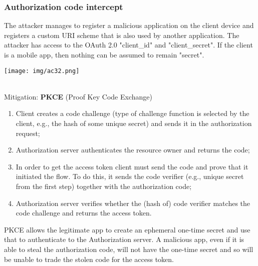 \documentclass[a4paper, 10pt, titlepage]{article}
\begin{document}
\subsubsection{Authorization code intercept}
\begin{minipage}{0.5\textwidth}
The attacker manages to register a malicious application on the client device and registers a custom URI scheme that is also used by another application. The attacker has access to the OAuth 2.0 "client\_id" and "client\_secret". If the client is a mobile app, then nothing can be assumed to remain "secret".
\end{minipage}
\hfill
\begin{minipage}{0.4\textwidth}
\begin{center}
\texttt{[image: img/ac32.png]}
\end{center}
\end{minipage}\medskip\\
Mitigation: \textbf{PKCE} (Proof Key Code Exchange)
\begin{enumerate} 
\item Client creates a code challenge (type of challenge function is selected by the client, e.g., the hash of some unique secret) and
sends it in the authorization request;
\item Authorization server authenticates the resource owner and returns the code;
\item In order to get the access token client must send the code and prove that it initiated the flow. To do this, it sends the code verifier (e.g., unique secret from the first step) together with the authorization code;
\item Authorization server verifies whether the (hash of) code verifier matches the code challenge and returns the access token.
\end{enumerate}
PKCE allows the legitimate app to create an ephemeral one-time secret
and use that to authenticate to the Authorization server. A malicious app, even if it is able to steal the authorization code, will not
have the one-time secret and so will be unable to trade the stolen code for the access token.
\end{document}
